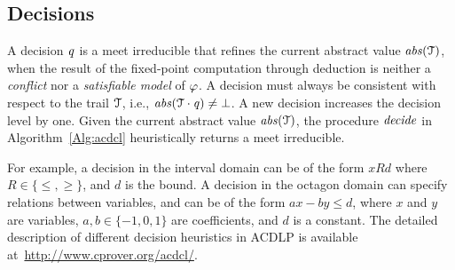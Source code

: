 \subsection{Decisions}\label{sec:decide}
%
A decision $\mathit{q}$ is a meet irreducible that refines the
current abstract value $\mathit{abs}(\mathcal{T})$, when the result of the fixed-point 
computation through deduction is neither a {\em conflict} nor a {\em 
satisfiable model} 
of $\varphi$.  A decision must always be consistent 
with respect to the trail $\mathcal{T}$, 
i.e., $\mathit{abs}(\mathcal{T}\cdot \mathit{q})\neq \bot$.  A new 
decision increases the decision level by one. Given the 
current abstract value $\mathit{abs}(\mathcal{T})$, the procedure $\mathit{decide}$ 
in Algorithm~\ref{Alg:acdcl} heuristically returns a meet irreducible.


%
For example, a decision in the interval domain can be of the form 
$x R d$ where $R \in \{\leq,\allowbreak\geq\}$, and $d$ 
is the bound.  A decision in the octagon domain can specify relations 
between variables, and can be of the form $ax - by \leq d$, where 
$x$ and $y$ are variables, $a,b \in \{-1,0,1\}$ are coefficients, 
and $d$ is a constant.  The detailed description of different 
decision heuristics in ACDLP is available at~\url{http://www.cprover.org/acdcl/}.

%

%

